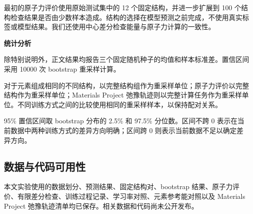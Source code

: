 \documentclass[UTF8,a4paper,12pt,fontset=fandol]{ctexart}
\begin{document}
最初的原子力评价使用原始测试集中的 12 个固定结构，并进一步扩展到 100 个结构检查结果是否由少数样本造成。结构的选择在模型预测之前完成，不使用真实标签或模型结果。我们还使用中心差分检查能量与原子力计算的一致性。


\textbf{统计分析}

除特别说明外，正文结果均报告三个固定随机种子的均值和样本标准差。置信区间采用 10000 次 bootstrap 重采样计算。

对于元素组成相同的不同结构，以完整结构组作为重采样单位；原子力评价以完整结构作为重采样单位；Materials Project 弛豫轨迹则以完整计算任务作为重采样单位。不同训练方式之间的比较使用相同的重采样样本，以保持配对关系。

95\% 置信区间取 bootstrap 分布的 2.5\% 和 97.5\% 分位数。区间不跨 0 表示在当前数据中两种训练方式的差异方向明确；区间跨 0 则表示当前数据不足以确定差异方向。


\subsection{数据与代码可用性}

本文实验使用的数据划分、预测结果、固定结构对、bootstrap 结果、原子力评价、有限差分检查、训练过程记录、学习率对照、元素参考能对照以及 Materials Project 弛豫轨迹清单均已保存。相关数据和代码尚未公开发布。

\clearpage


\end{document}
